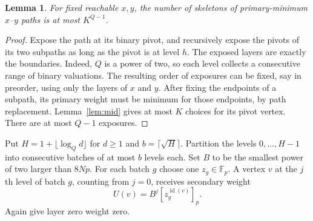 \documentclass[11pt]{article}
\newtheorem{lemma}[theorem]{Lemma}
\newcommand{\F}{\mathbb F}
\begin{document}
\begin{lemma}\label{lem:skeleton}
For fixed reachable $x,y$, the number of skeletons of primary-minimum $x$--$y$ paths is at most $K^{Q-1}$.
\end{lemma}
\begin{proof}
Expose the path at its binary pivot, and recursively expose the pivots of its two subpaths as long as the pivot is at level $h$. The exposed layers are exactly the boundaries. Indeed, $Q$ is a power of two, so each level collects a consecutive range of binary valuations. The resulting order of exposures can be fixed, say in preorder, using only the layers of $x$ and $y$. After fixing the endpoints of a subpath, its primary weight must be minimum for those endpoints, by path replacement. Lemma~\ref{lem:mid} gives at most $K$ choices for its pivot vertex. There are at most $Q-1$ exposures.
\end{proof}

Put $H=1+\lfloor\log_Q d\rfloor$ for $d\ge1$ and $b=\lceil\sqrt H\rceil$. Partition the levels $0,\ldots,H-1$ into consecutive batches of at most $b$ levels each. Set $B$ to be the smallest power of two larger than $8Np$. For each batch $g$ choose one $z_g\in\F_p$. A vertex $v$ at the $j$th level of batch $g$, counting from $j=0$, receives secondary weight
\[
                     U(v)= B^j [z_g^{\operatorname{id}(v)}]_p .
\]
Again give layer zero weight zero.
\end{document}
